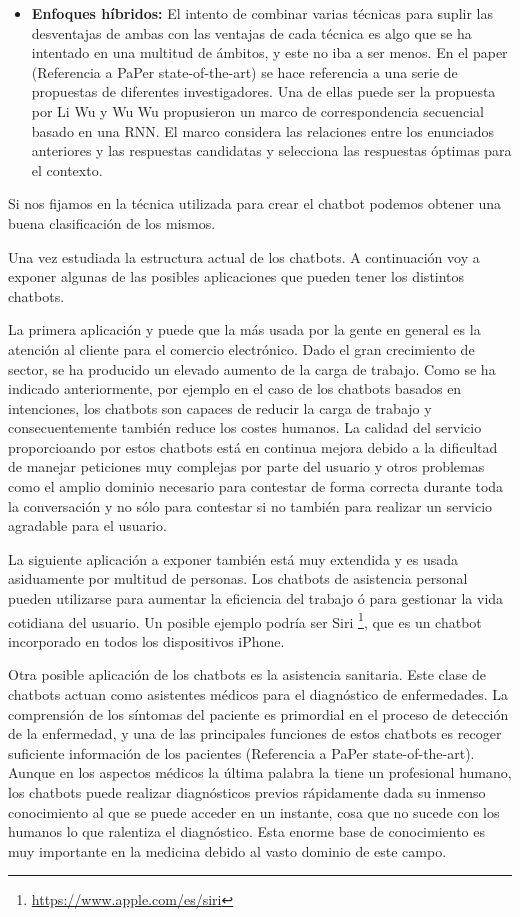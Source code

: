 \begin{itemize}
    \item \textbf{Enfoques híbridos:} El intento de combinar varias técnicas para suplir las desventajas de ambas con las ventajas de cada técnica es algo que se ha intentado en una multitud de ámbitos, y este no iba a ser menos. En el paper (Referencia a PaPer state-of-the-art) se hace referencia a una serie de propuestas de diferentes investigadores. Una de ellas puede ser la propuesta por Li Wu  y Wu Wu propusieron un marco de correspondencia secuencial basado en una RNN. El marco considera las relaciones entre los enunciados anteriores y las respuestas candidatas y selecciona las respuestas óptimas para el contexto.
\end{itemize}

Si nos fijamos en la técnica utilizada para crear el chatbot podemos obtener una buena clasificación de los mismos.

Una vez estudiada la estructura actual de los chatbots. A continuación voy a exponer algunas de las posibles aplicaciones que pueden tener los distintos chatbots.

La primera aplicación y puede que la más usada por la gente en general es la atención al cliente para el comercio electrónico. Dado el gran crecimiento de sector, se ha producido un elevado aumento de la carga de trabajo. Como se ha indicado anteriormente, por ejemplo en el caso de los chatbots basados en intenciones, los chatbots son capaces de reducir la carga de trabajo y consecuentemente también reduce los costes humanos. La calidad del servicio proporcioando por estos chatbots está en continua mejora debido a la dificultad de manejar peticiones muy complejas por parte del usuario y otros problemas como el amplio dominio necesario para contestar de forma correcta durante toda la conversación y no sólo para contestar si no también para realizar un servicio agradable para el usuario.

La siguiente aplicación a exponer también está muy extendida y es usada asiduamente por multitud de personas. Los chatbots de asistencia personal pueden utilizarse para aumentar la eficiencia del trabajo ó para gestionar la vida cotidiana del usuario. Un posible ejemplo podría ser Siri \footnote{\url{https://www.apple.com/es/siri}}, que es un chatbot incorporado en todos los dispositivos iPhone.

Otra posible aplicación de los chatbots es la asistencia sanitaria. Este clase de chatbots actuan como asistentes médicos para el diagnóstico de enfermedades. La comprensión de los síntomas del paciente es primordial en el proceso de detección de la enfermedad, y una de las principales funciones de estos chatbots es recoger suficiente información de los pacientes (Referencia a PaPer state-of-the-art). Aunque en los aspectos médicos la última palabra la tiene un profesional humano, los chatbots puede realizar diagnósticos previos rápidamente dada su inmenso conocimiento al que se puede acceder en un instante, cosa que no sucede con los humanos lo que ralentiza el diagnóstico. Esta enorme base de conocimiento es muy importante en la medicina debido al vasto dominio de este campo.

